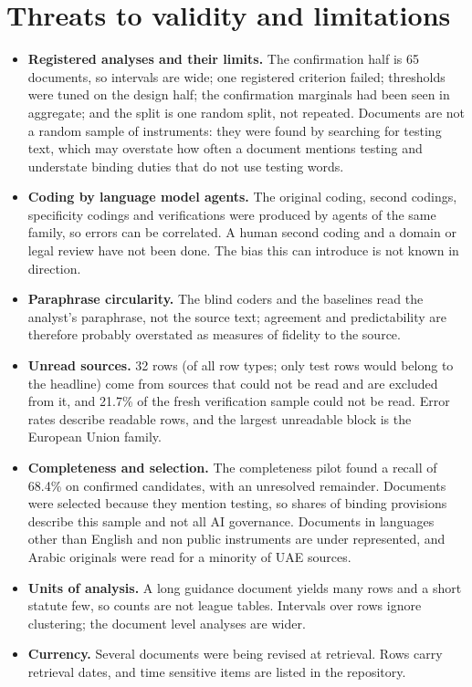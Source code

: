 \documentclass[conference]{IEEEtran}
\begin{document}
\section{Threats to validity and limitations}\label{sec:limits}
\begin{itemize}
\item \textbf{Registered analyses and their limits.} The confirmation half is 65 documents, so intervals are wide; one registered criterion failed; thresholds were tuned on the design half; the confirmation marginals had been seen in aggregate; and the split is one random split, not repeated. Documents are not a random sample of instruments: they were found by searching for testing text, which may overstate how often a document mentions testing and understate binding duties that do not use testing words.
\item \textbf{Coding by language model agents.} The original coding, second codings, specificity codings and verifications were produced by agents of the same family, so errors can be correlated. A human second coding and a domain or legal review have not been done. The bias this can introduce is not known in direction.
\item \textbf{Paraphrase circularity.} The blind coders and the baselines read the analyst's paraphrase, not the source text; agreement and predictability are therefore probably overstated as measures of fidelity to the source.
\item \textbf{Unread sources.} 32 rows (of all row types; only test rows would belong to the headline) come from sources that could not be read and are excluded from it, and 21.7\% of the fresh verification sample could not be read. Error rates describe readable rows, and the largest unreadable block is the European Union family.
\item \textbf{Completeness and selection.} The completeness pilot found a recall of 68.4\% on confirmed candidates, with an unresolved remainder. Documents were selected because they mention testing, so shares of binding provisions describe this sample and not all AI governance. Documents in languages other than English and non public instruments are under represented, and Arabic originals were read for a minority of UAE sources.
\item \textbf{Units of analysis.} A long guidance document yields many rows and a short statute few, so counts are not league tables. Intervals over rows ignore clustering; the document level analyses are wider.
\item \textbf{Currency.} Several documents were being revised at retrieval. Rows carry retrieval dates, and time sensitive items are listed in the repository.

\end{itemize}
\end{document}
